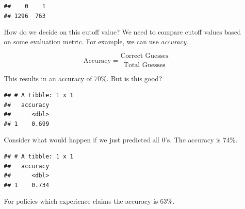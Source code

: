 \documentclass[openany]{book}
\newenvironment{Shaded}{\begin{snugshade}}{\end{snugshade}}
\newcommand{\DataTypeTok}[1]{\textcolor[rgb]{0.13,0.29,0.53}{#1}}
\newcommand{\DecValTok}[1]{\textcolor[rgb]{0.00,0.00,0.81}{#1}}
\newcommand{\KeywordTok}[1]{\textcolor[rgb]{0.13,0.29,0.53}{\textbf{#1}}}
\newcommand{\NormalTok}[1]{#1}
\newcommand{\OperatorTok}[1]{\textcolor[rgb]{0.81,0.36,0.00}{\textbf{#1}}}
\newcommand{\StringTok}[1]{\textcolor[rgb]{0.31,0.60,0.02}{#1}}
\begin{document}
\begin{verbatim}
##    0    1 
## 1296  763
\end{verbatim}

How do we decide on this cutoff value? We need to compare cutoff values based on some evaluation metric. For example, we can use \emph{accuracy}.

\[\text{Accuracy} = \frac{\text{Correct Guesses}}{\text{Total Guesses}}\]

This results in an accuracy of 70\%. But is this good?

\begin{Shaded}
\end{Shaded}

\begin{verbatim}
## # A tibble: 1 x 1
##   accuracy
##      <dbl>
## 1    0.699
\end{verbatim}

Consider what would happen if we just predicted all 0's. The accuracy is 74\%.

\begin{Shaded}
\end{Shaded}

\begin{verbatim}
## # A tibble: 1 x 1
##   accuracy
##      <dbl>
## 1    0.734
\end{verbatim}

For policies which experience claims the accuracy is 63\%.

\begin{Shaded}
\end{Shaded}
\end{document}
